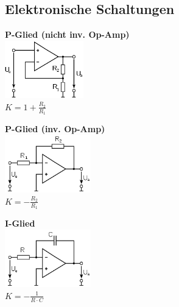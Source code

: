     \subsection {Elektronische Schaltungen}
    \begin{minipage}{7cm}
    \textbf{P-Glied (nicht inv. Op-Amp)}\\
    \includegraphics[height=2.5cm]{./bilder/OP-Amp.png} \\
    $K = 1 + \frac{R_2}{R_1}$
    \end{minipage}
    \begin{minipage}{6cm}
	\textbf{P-Glied (inv. Op-Amp)} \\ 
	\includegraphics[height=2.5cm]{./bilder/OP-InvAmp.png} \\
	$K=-\frac{R_2}{R_1}$
    \end{minipage}
    \begin{minipage}{6cm}
	\textbf{I-Glied} \\ 
	\includegraphics[height=2.5cm]{./bilder/OP-Integrator.png}\\
	$K = - \frac{1}{R \cdot C}$
    \end{minipage}  
    
		